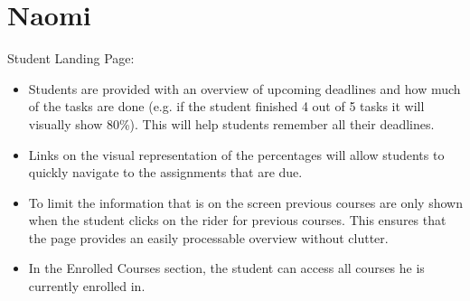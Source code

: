 \section{Naomi}

Student Landing Page:

\begin{itemize}

\item Students are provided with an overview of upcoming deadlines and how much of the tasks are done (e.g. if the student finished 4 out of 5 tasks it will visually show 80\%). This will help students remember all their deadlines.

\item Links on the visual representation of the percentages will allow students to quickly navigate to the assignments that are due.

\item To limit the information that is on the screen previous courses are only shown when the student clicks on the rider for previous courses. This ensures that the page provides an easily processable overview without clutter.

\item In the Enrolled Courses section, the student can access all courses he is currently enrolled in.

\end{itemize}
